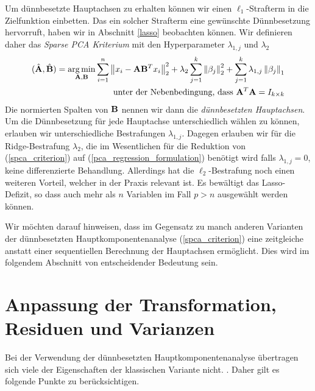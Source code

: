 Um dünnbesetzte Hauptachsen zu erhalten können wir einen $\ell_1$-Strafterm in die Zielfunktion einbetten. Das ein solcher Strafterm eine gewünschte Dünnbesetzung hervorruft, haben wir in Abschnitt \ref{lasso} beobachten können. Wir definieren daher das \textit{Sparse PCA Kriterium} mit den Hyperparameter $\lambda_{1,j}$ und $\lambda_2$
\begin{align}
\label{spca_criterion}
\begin{split}
(\hat{\mathbf{A}}, \hat{\mathbf{B}}) = \operatorname*{arg\,min}_{\mathbf{A}, \mathbf{B}} \sum_{i=1}^{n} \left\lVert x_i - \mathbf{A}\mathbf{B}^Tx_i \right\rVert_2^2 + \lambda_2 \sum_{j=1}^{k}\left\lVert \beta_j \right\rVert_2^2 + \sum_{j=1}^k \lambda_{1,j} \left\lVert \beta_j \right\rVert_1\\
\text{unter der Nebenbedingung, dass } \mathbf{A}^T\mathbf{A} = I_{k \times k}
\end{split}
\end{align}
Die normierten Spalten von $\mathbf{B}$ nennen wir dann die \textit{dünnbesetzten Hauptachsen}. Um die Dünnbesetzung für jede Hauptachse unterschiedlich wählen zu können, erlauben wir unterschiedliche Bestrafungen $\lambda_{1,j}$. Dagegen erlauben wir für die Ridge-Bestrafung $\lambda_2$, die im Wesentlichen für die Reduktion von (\ref{spca_criterion}) auf (\ref{pca_regression_formulation}) benötigt wird falls $\lambda_{1,j} = 0$, keine differenzierte Behandlung. Allerdings hat die $\ell_2$-Bestrafung noch einen weiteren Vorteil, welcher in der Praxis relevant ist. Es bewältigt das Lasso-Defizit, so dass auch mehr als $n$ Variablen im Fall $p>n$ ausgewählt werden können.

Wir möchten darauf hinweisen, dass im Gegensatz zu manch anderen Varianten der dünnbesetzten Hauptkomponentenanalyse (\ref{spca_criterion}) eine zeitgleiche anstatt einer sequentiellen Berechnung der Hauptachsen ermöglicht. Dies wird im folgendem Abschnitt von entscheidender Bedeutung sein.





\section{Anpassung der Transformation, Residuen und Varianzen}

Bei der Verwendung der dünnbesetzten Hauptkomponentenanalyse übertragen sich viele der Eigenschaften der klassischen Variante nicht. \cite{camacho}. Daher gilt es folgende Punkte zu berücksichtigen.\\

